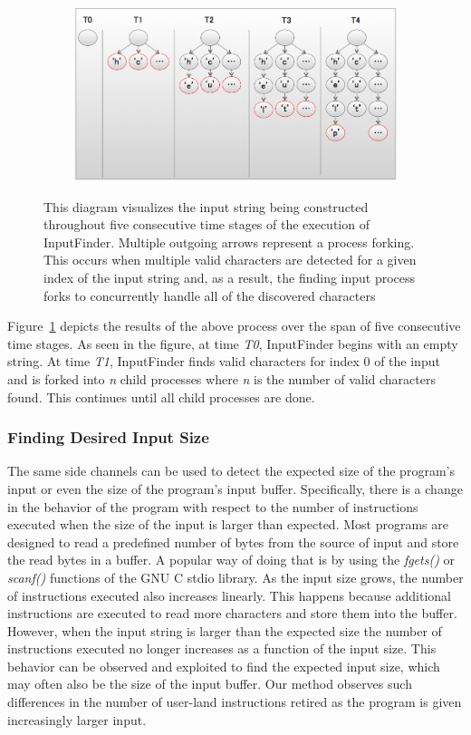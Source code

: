 \documentclass{acm_proc_article-sp}
\def \tool {InputFinder}
\begin{document}
\begin{figure}[t]
\centering
\includegraphics[height=2in,width=6.5in]{string_builder.png}
\label{fig:string_builder}
\caption{This diagram visualizes the input string being constructed throughout five consecutive time stages of the execution of \tool{}. Multiple outgoing arrows represent a process forking. This occurs when multiple valid characters are detected for a given index of the input string and, as a result, the finding input process forks to concurrently handle all of the discovered characters}
\end{figure}

Figure~\ref{fig:string_builder} depicts the results of the above process over the span of five consecutive time stages.
As seen in the figure, at time \textit{T0}, \tool{} begins with an empty string.
At time \textit{T1}, \tool{} finds valid characters for index 0 of the input and is forked into \textit{n} child processes where \textit{n} is the number of valid characters found.
This continues until all child processes are done.

\subsubsection{Finding Desired Input Size}
The same side channels can be used to detect the expected size of the program's input or even the size of the program's input buffer.
Specifically, there is a change in the behavior of the program with respect to the number of instructions executed when the size of the input is larger than expected.
Most programs are designed to read a predefined number of bytes from the source of input and store the read bytes in a buffer.
A popular way of doing that is by using the \textit{fgets()} or \textit{scanf()} functions of the GNU C stdio library.
As the input size grows, the number of instructions executed also increases linearly.
This happens because additional instructions are executed to read more characters and store them into the buffer.
However, when the input string is larger than the expected size the number of instructions executed no longer increases as a function of the input size.
This behavior can be observed and exploited to find the expected input size, which may often also be the size of the input buffer.
Our method observes such differences in the number of user-land instructions retired as the program is given increasingly larger input.
\end{document}
